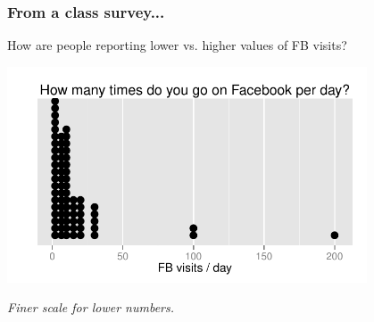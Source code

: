 \documentclass[11pt]{beamer}
\newcommand{\soln}[1]{\textit{#1}}
\begin{document}

\begin{frame}[fragile]
\frametitle{From a class survey...}

\alert{How are people reporting lower vs. higher values of FB visits?}

\begin{center}
\includegraphics[width=0.8\textwidth]{figures/survey/dot_fb_visits_per_day} 
\end{center}

\pause

\soln{Finer scale for lower numbers.}


\end{frame}

\end{document}
